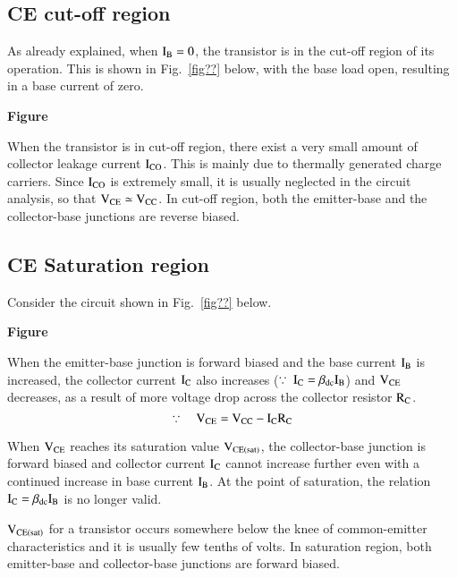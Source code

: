 \subsection{CE cut-off region}\label{sec2.5.1}

As already explained, when $\textrm{I}_{\textrm{B}}=0$, the transistor is in the cut-off region of its operation. This is shown in Fig.~\ref{fig??} below, with the base load open, resulting in a base current of zero.
\begin{center}
{\bf Figure}
\end{center}

When the transistor is in cut-off region, there exist a very small amount of collector leakage current $\textrm{I}_{\text{CO}}$. This is mainly due to thermally generated charge carriers. Since $\textrm{I}_{\text{CO}}$ is extremely small, it is usually neglected in the circuit analysis, so that $\textrm{V}_{\text{CE}}\simeq \textrm{V}_{\text{CC}}$. In cut-off region, both the emitter-base and the collector-base junctions are reverse biased.

\subsection{CE Saturation region}\label{sec2.5.2}

Consider the circuit shown in Fig.~\ref{fig??} below.
\begin{center}
{\bf Figure}
\end{center}

When the emitter-base junction is forward biased and the base current $\textrm{I}_{\textrm{B}}$ is increased, the collector current $\textrm{I}_{\textrm{C}}$ also increases ($\because ~ \textrm{I}_{\textrm{C}}=\beta_{\text{dc}}\textrm{I}_{\textrm{B}}$) and $\textrm{V}_{\text{CE}}$ decreases, as a result of more voltage drop across the collector resistor $\textrm{R}_{\textrm{C}}$.
$$
\because\quad \textrm{V}_{\text{CE}}=\textrm{V}_{\text{CC}}-\textrm{I}_{\textrm{C}}\textrm{R}_{\textrm{C}}
$$

When $\textrm{V}_{\text{CE}}$ reaches its saturation value $\textrm{V}_{\text{CE(sat)}}$, the collector-base junction is forward biased and collector current $\textrm{I}_{\textrm{C}}$ cannot increase further even with a continued increase in base current $\textrm{I}_{\textrm{B}}$. At the point of saturation, the relation $\textrm{I}_{\textrm{C}}=\beta_{\text{dc}}\textrm{I}_{\textrm{B}}$ is no longer valid.

$\textrm{V}_{\text{CE(sat)}}$ for a transistor occurs somewhere below the knee of common-emitter characteristics and it is usually few tenths of volts. In saturation region, both emitter-base and collector-base junctions are forward biased.

